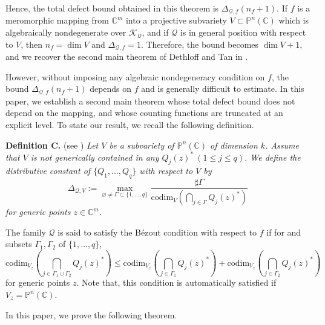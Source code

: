 \documentclass[12pt,leqno]{amsart}
\def\underset#1#2{{\mathrel{\mathop {{}_{} {#2}}\limits_{{#1}_{}}}}}
\newcommand{\C}{{\mathbb{C}}}
\renewcommand{\P}{{\mathbb{P}}}
\numberwithin{equation}{section}
\begin{document}
Hence, the total defect bound obtained in this theorem is $\Delta_{\mathcal Q,f}(n_f+1)$. If $f$ is a meromorphic mapping from $\C^m$ into a projective subvariety $V\subset\P^n(\C)$ which is algebraically nondegenerate over $\mathcal K_{\mathcal Q}$, and if $\mathcal Q$ is in general position with respect to $V$, then $n_f=\dim V$ and $\Delta_{\mathcal Q,f}=1$. Therefore, the bound becomes $\dim V+1$, and we recover the second main theorem of Dethloff and Tan in \cite{DT2}. 

However, without imposing any algebraic nondegeneracy condition on $f$, the bound $\Delta_{\mathcal Q,f}(n_f+1)$ depends on $f$ and is generally difficult to estimate. In this paper, we establish a second main theorem whose total defect bound does not depend on the mapping, and whose counting functions are truncated at an explicit level. To state our result, we recall the following definition.

\vskip0.2cm
\noindent
{\bf Definition C.} (see \cite[Definition 3.4]{Q22c})
{\it Let $V$ be a subvariety of $\P^n(\C)$ of dimension $k$. Assume that $V$ is not generically contained in any $Q_j(z)^*\ (1\le j\le q)$. We define the distributive constant of $\{Q_1,\ldots,Q_q\}$ with respect to $V$ by
$$
\Delta_{\mathcal Q,V}:=\underset{\varnothing\ne\Gamma\subset\{1,\ldots,q\}}{\max}\dfrac{\sharp\Gamma}{\mathrm{codim}_V\left(\bigcap_{j\in\Gamma}Q_j(z)^*\right)}
$$
for generic points $z\in\C^m$.}

The family $\mathcal Q$ is said to satisfy the B\'{e}zout condition with respect to $f$ if for and subsets $\Gamma_1,\Gamma_2$ of $\{1,\ldots,q\}$,
$$ \mathrm{codim}_{V_z}\left(\bigcap_{j\in\Gamma_1\cup\Gamma_2}Q_j(z)^*\right)\le \mathrm{codim}_{V_z}\left(\bigcap_{j\in\Gamma_1}Q_j(z)^*\right)+\mathrm{codim}_{V_z}\left(\bigcap_{j\in\Gamma_2}Q_j(z)^*\right)$$
for generic points $z$. Note that, this condition is automatically satisfied if $V_z=\P^n(\C).$

In this paper, we prove the following theorem.
\end{document}
